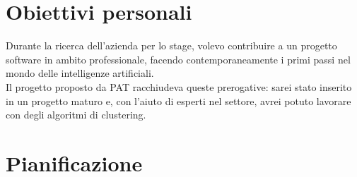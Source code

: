 \section{Obiettivi personali}

Durante la ricerca dell'azienda per lo stage, volevo contribuire a un progetto software in ambito professionale, facendo contemporaneamente i primi passi nel mondo delle intelligenze artificiali.\\
Il progetto proposto da PAT racchiudeva queste prerogative: sarei stato inserito in un progetto maturo e, con l'aiuto di esperti nel settore, avrei potuto lavorare con degli algoritmi di clustering.   

\section{Pianificazione}

